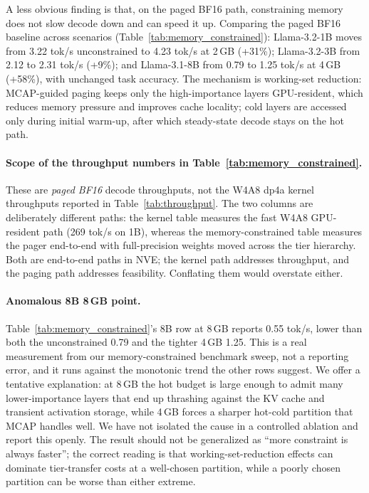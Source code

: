\documentclass{article}
\begin{document}
A less obvious finding is that, on the paged BF16 path, constraining memory
does not slow decode down and can speed it up. Comparing the paged BF16
baseline across scenarios (Table~\ref{tab:memory_constrained}): Llama-3.2-1B
moves from 3.22 tok/s unconstrained to 4.23 tok/s at 2\,GB (+31\%);
Llama-3.2-3B from 2.12 to 2.31 tok/s (+9\%); and Llama-3.1-8B from 0.79 to
1.25 tok/s at 4\,GB (+58\%), with unchanged task accuracy. The mechanism is
working-set reduction: MCAP-guided paging keeps only the high-importance
layers GPU-resident, which reduces memory pressure and improves cache
locality; cold layers are accessed only during initial warm-up, after which
steady-state decode stays on the hot path.

\paragraph{Scope of the throughput numbers in Table~\ref{tab:memory_constrained}.} These
are \emph{paged BF16} decode throughputs, not the W4A8 dp4a kernel throughputs reported
in Table~\ref{tab:throughput}. The two columns are deliberately different paths: the
kernel table measures the fast W4A8 GPU-resident path (269 tok/s on 1B), whereas the
memory-constrained table measures the pager end-to-end with full-precision weights moved
across the tier hierarchy. Both are end-to-end paths in NVE; the kernel path
addresses throughput, and the paging path addresses feasibility. Conflating
them would overstate either.

\paragraph{Anomalous 8B 8\,GB point.} Table~\ref{tab:memory_constrained}'s 8B row at
8\,GB reports 0.55 tok/s, lower than both the unconstrained 0.79 and the tighter 4\,GB
1.25. This is a real measurement from our memory-constrained benchmark sweep, not a
reporting error, and it runs against the monotonic trend the other rows suggest. We
offer a tentative explanation: at 8\,GB the hot budget is large enough to admit many
lower-importance layers that end up thrashing against the KV cache and transient
activation storage, while 4\,GB forces a sharper hot-cold partition that MCAP handles
well. We have not isolated the cause in a controlled ablation and report this
openly. The result should not be generalized as ``more constraint is always
faster''; the correct reading is that working-set-reduction effects can
dominate tier-transfer costs at a well-chosen partition, while a poorly chosen
partition can be worse than either extreme.
\end{document}
